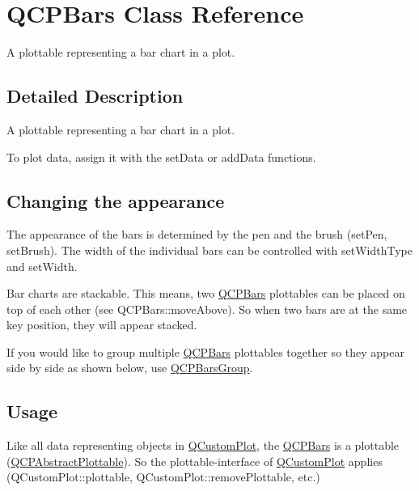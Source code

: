 \hypertarget{class_q_c_p_bars}{}\section{Q\+C\+P\+Bars Class Reference}
\label{class_q_c_p_bars}


A plottable representing a bar chart in a plot.  




\subsection{Detailed Description}
A plottable representing a bar chart in a plot. 



To plot data, assign it with the set\+Data or add\+Data functions.\hypertarget{class_q_c_p_bars_qcpbars-appearance}{}\subsection{Changing the appearance}\label{class_q_c_p_bars_qcpbars-appearance}
The appearance of the bars is determined by the pen and the brush (set\+Pen, set\+Brush). The width of the individual bars can be controlled with set\+Width\+Type and set\+Width.

Bar charts are stackable. This means, two \mbox{\hyperlink{class_q_c_p_bars}{Q\+C\+P\+Bars}} plottables can be placed on top of each other (see Q\+C\+P\+Bars\+::move\+Above). So when two bars are at the same key position, they will appear stacked.

If you would like to group multiple \mbox{\hyperlink{class_q_c_p_bars}{Q\+C\+P\+Bars}} plottables together so they appear side by side as shown below, use \mbox{\hyperlink{class_q_c_p_bars_group}{Q\+C\+P\+Bars\+Group}}.

\hypertarget{class_q_c_p_bars_qcpbars-usage}{}\subsection{Usage}\label{class_q_c_p_bars_qcpbars-usage}
Like all data representing objects in \mbox{\hyperlink{class_q_custom_plot}{Q\+Custom\+Plot}}, the \mbox{\hyperlink{class_q_c_p_bars}{Q\+C\+P\+Bars}} is a plottable (\mbox{\hyperlink{class_q_c_p_abstract_plottable}{Q\+C\+P\+Abstract\+Plottable}}). So the plottable-\/interface of \mbox{\hyperlink{class_q_custom_plot}{Q\+Custom\+Plot}} applies (Q\+Custom\+Plot\+::plottable, Q\+Custom\+Plot\+::remove\+Plottable, etc.)

